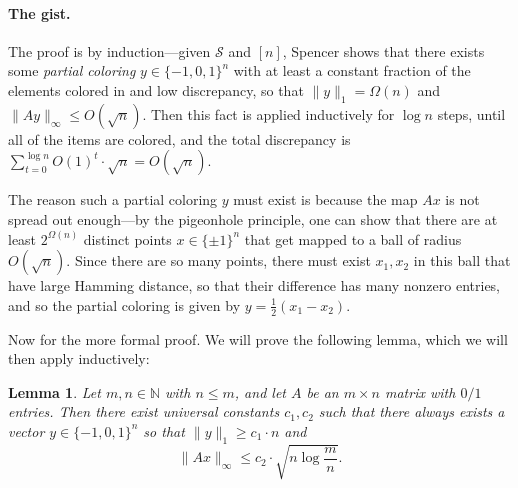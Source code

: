 \documentclass{article}
\theoremstyle{theorem}
\newtheorem{lemma}{Lemma}
\theoremstyle{definition}
\newcommand{\N}{\mathbb{N}}
\newcommand{\cS}{\mathcal{S}}
\begin{document}
\paragraph{The gist.}
The proof is by induction---given $\cS$ and $[n]$, Spencer shows that there exists some \emph{partial coloring} $y \in \{-1,0,1\}^n$ with at least a constant fraction of the elements colored in and low discrepancy, so that $\|y\|_1 = \Omega(n)$ and $\|Ay\|_{\infty} \le O(\sqrt{n})$.
Then this fact is applied inductively for $\log n$ steps, until all of the items are colored, and the total discrepancy is $\sum_{t=0}^{\log n} O(1)^t\cdot \sqrt{n} = O(\sqrt{n})$.

The reason such a partial coloring $y$ must exist is because the map $Ax$ is not spread out enough---by the pigeonhole principle, one can show that there are at least $2^{\Omega(n)}$ distinct points $x \in \{\pm 1\}^n$ that get mapped to a ball of radius $O(\sqrt{n})$.
Since there are so many points, there must exist $x_1,x_2$ in this ball that have large Hamming distance, so that their difference has many nonzero entries, and so the partial coloring is given by $y = \frac{1}{2}(x_1-x_2)$.
\medskip

Now for the more formal proof.
We will prove the following lemma, which we will then apply inductively:
\begin{lemma}
Let $m,n \in \N$ with $n \le m$, and let $A$ be an $m \times n$ matrix with $0/1$ entries.
    Then there exist universal constants $c_1,c_2$ such that there always exists a vector $y \in \{-1,0,1\}^n$ so that $\|y\|_1 \ge c_1 \cdot n$ and
\[
    \|Ax\|_{\infty} \le c_2\cdot \sqrt{n\log\frac{m}{n}}.
\]
\end{lemma}
\end{document}

